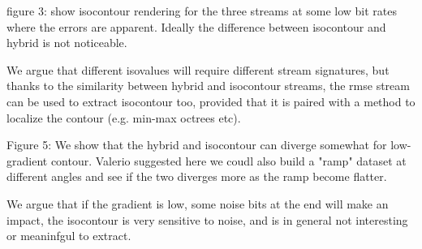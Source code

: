 figure 3: show isocontour rendering for the three streams at some low bit rates where the errors are
apparent. Ideally the difference between isocontour and hybrid is not noticeable.

We argue that different isovalues will require different stream signatures, but thanks to the
similarity between hybrid and isocontour streams, the rmse stream can be used to extract isocontour
too, provided that it is paired with a method to localize the contour (e.g. min-max octrees etc).

Figure 5: We show that the hybrid and isocontour can diverge somewhat for low-gradient contour.
Valerio suggested here we coudl also build a "ramp" dataset at different angles and see if the two
diverges more as the ramp become flatter.

We argue that if the gradient is low, some noise bits at the end will make an impact, the isocontour
is very sensitive to noise, and is in general not interesting or meaninfgul to extract.
